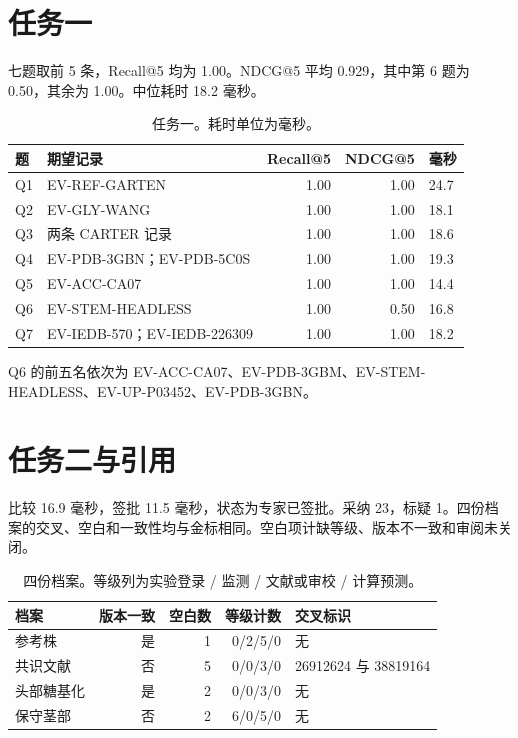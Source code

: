 \section{任务一}
七题取前 5 条，Recall@5 均为 1.00。NDCG@5 平均 0.929，其中第 6 题为 0.50，其余为 1.00。中位耗时 18.2 毫秒。

\begin{table}[ht]
\centering
\caption{任务一。耗时单位为毫秒。}
\footnotesize
\setlength{\tabcolsep}{3pt}
\begin{tabular}{llrrl}
\toprule
题 & 期望记录 & Recall@5 & NDCG@5 & 毫秒 \\
\midrule
Q1 & EV-REF-GARTEN & 1.00 & 1.00 & 24.7 \\
Q2 & EV-GLY-WANG & 1.00 & 1.00 & 18.1 \\
Q3 & 两条 CARTER 记录 & 1.00 & 1.00 & 18.6 \\
Q4 & EV-PDB-3GBN；EV-PDB-5C0S & 1.00 & 1.00 & 19.3 \\
Q5 & EV-ACC-CA07 & 1.00 & 1.00 & 14.4 \\
Q6 & EV-STEM-HEADLESS & 1.00 & 0.50 & 16.8 \\
Q7 & EV-IEDB-570；EV-IEDB-226309 & 1.00 & 1.00 & 18.2 \\
\bottomrule
\end{tabular}
\end{table}

Q6 的前五名依次为 EV-ACC-CA07、EV-PDB-3GBM、EV-STEM-HEADLESS、EV-UP-P03452、EV-PDB-3GBN。

\section{任务二与引用}
比较 16.9 毫秒，签批 11.5 毫秒，状态为专家已签批。采纳 23，标疑 1。四份档案的交叉、空白和一致性均与金标相同。空白项计缺等级、版本不一致和审阅未关闭。

\begin{table}[ht]
\centering
\caption{四份档案。等级列为实验登录 / 监测 / 文献或审校 / 计算预测。}
\footnotesize
\begin{tabular}{lrrrl}
\toprule
档案 & 版本一致 & 空白数 & 等级计数 & 交叉标识 \\
\midrule
参考株 & 是 & 1 & 0/2/5/0 & 无 \\
共识文献 & 否 & 5 & 0/0/3/0 & 26912624 与 38819164 \\
头部糖基化 & 是 & 2 & 0/0/3/0 & 无 \\
保守茎部 & 否 & 2 & 6/0/5/0 & 无 \\
\bottomrule
\end{tabular}
\end{table}

